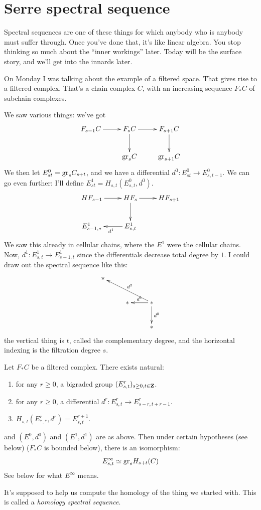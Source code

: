 \section{Serre spectral sequence}
Spectral sequences are one of these things for which anybody who is anybody must suffer through.
Once you've done that, it's like linear algebra.
You stop thinking so much about the ``inner workings'' later.
Today will be the surface story, and we'll get into the innards later.

On Monday I was talking about the example of a filtered space.
That gives rise to a filtered complex.
That's a chain complex $C$, with an increasing sequence $F_\ast C$ of subchain complexes.

We saw various things: we've got
\begin{equation*}
    \xymatrix{
	F_{s-1} C \ar[r] & F_s C \ar[d] \ar[r] & F_{s+1} C\ar[d]\\
	& \gr_s C & \gr_{s+1} C
    }
\end{equation*}
We then let $E^0_{st} = \mathrm{gr}_s C_{s+t}$, and we have a differential $d^0:E^0_{st} \to E^0_{s, t-1}$.
We can go even further: I'll define $E^1_{st} = H_{s,t}(E^0_{s,t}, d^0)$.
\begin{equation*}
    \xymatrix{
	HF_{s-1}\ar[r] & HF_s \ar[r] \ar[d] & HF_{s+1}\\
	E^1_{s-1,\ast} & E^1_{s,t}\ar[l]^{d^1} & 
    }
\end{equation*}
We saw this already in cellular chains, where the $E^1$ were the cellular chains.
Now, $d^1:E^1_{s,t} \to E^1_{s-1,t}$ since the differentials decrease total degree by $1$.
I could draw out the spectral sequence like this:
\begin{equation*}
    \xymatrix{
	\ast & & \\
	& \ast & \ast\ar[d]^{d^0}\ar[l]_{d^1}\ar[ull]_{d^2} \\
	& & \ast
    }
\end{equation*}
the vertical thing is $t$, called the complementary degree, and the horizontal indexing is the filtration degree $s$.
\begin{theorem}
    Let $F_\ast C$ be a filtered complex.
    There exists natural:
    \begin{enumerate}
	\item for any $r\geq 0$, a bigraded group $(E^r_{s,t})_{s\geq 0, t\in\mathbf Z}$.
	\item for any $r\geq 0$, a differential $d^r:E^r_{s,t} \to E^r_{s-r,t+r - 1}$.
	\item $H_{s,t}(E^r_{\ast,\ast}, d^r) = E^{r+1}_{s,t}$.
    \end{enumerate}
    and $(E^0, d^0)$ and $(E^1, d^1)$ are as above.
    Then under certain hypotheses (see below) ($F_\ast C$ is bounded below), there is an isomorphism:
    $$
    E^\infty_{s,t} \simeq \mathrm{gr}_s H_{s+t}(C)
    $$
    See below for what $E^\infty$ means.
\end{theorem}
It's supposed to help us compute the homology of the thing we started with.
This is called a \emph{homology spectral sequence}.

